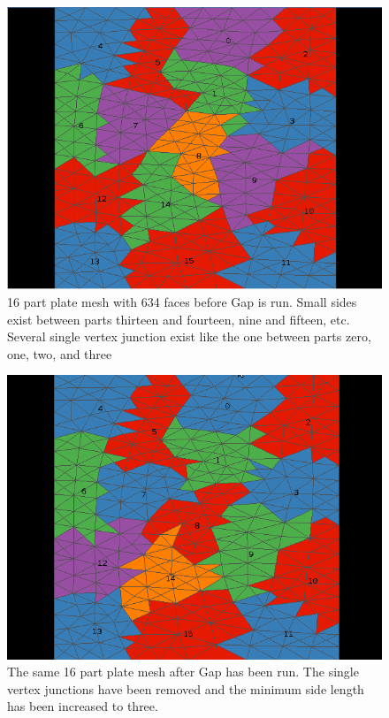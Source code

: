 \documentclass{thesis}
\begin{document}
\begin{figure} [!hp]
\centering
\captionsetup{justification=centering,margin=1cm}
\includegraphics[width=.6\textwidth]{results_before.png}
\caption{\label{fig:plate} \textnormal{16 part plate mesh with 634 faces before Gap is run. Small sides exist between parts thirteen and fourteen, nine and fifteen, etc. Several single vertex junction exist like the one between parts zero, one, two, and three}}
\end{figure}

\begin{figure} [!hp]
\centering
\captionsetup{justification=centering,margin=1cm}
\includegraphics[width=.6\textwidth]{results_after.png}
\caption{\label{fig:plate_gap} \textnormal{The same 16 part plate mesh after Gap has been run. The single vertex junctions have been removed and the minimum side length has been increased to three.}}
\end{figure}
\end{document}
